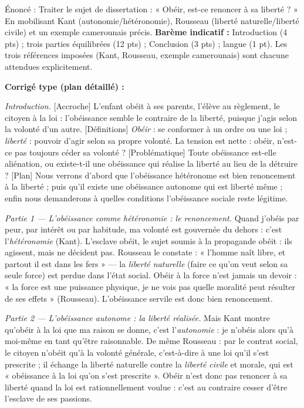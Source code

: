 \documentclass[11pt]{article}
\begin{document}
\begin{exoresolu}
Énoncé : Traiter le sujet de dissertation : « Obéir, est-ce renoncer à sa liberté ? » En mobilisant Kant (autonomie/hétéronomie), Rousseau (liberté naturelle/liberté civile) et un exemple camerounais précis.
\tcblower
\textbf{Barème indicatif :} Introduction (4 pts) ; trois parties équilibrées (12 pts) ; Conclusion (3 pts) ; langue (1 pt). Les trois références imposées (Kant, Rousseau, exemple camerounais) sont chacune attendues explicitement.

\textbf{Corrigé type (plan détaillé) :}

\emph{Introduction.} [Accroche] L'enfant obéit à ses parents, l'élève au règlement, le citoyen à la loi : l'obéissance semble le contraire de la liberté, puisque j'agis selon la volonté d'un autre. [Définitions] \emph{Obéir} : se conformer à un ordre ou une loi ; \emph{liberté} : pouvoir d'agir selon sa propre volonté. La tension est nette : obéir, n'est-ce pas toujours céder sa volonté ? [Problématique] Toute obéissance est-elle aliénation, ou existe-t-il une obéissance qui réalise la liberté au lieu de la détruire ? [Plan] Nous verrons d'abord que l'obéissance hétéronome est bien renoncement à la liberté ; puis qu'il existe une obéissance autonome qui est liberté même ; enfin nous demanderons à quelles conditions l'obéissance sociale reste légitime.

\emph{Partie 1 — L'obéissance comme hétéronomie : le renoncement.} Quand j'obéis par peur, par intérêt ou par habitude, ma volonté est gouvernée du dehors : c'est l'\emph{hétéronomie} (Kant). L'esclave obéit, le sujet soumis à la propagande obéit : ils agissent, mais ne décident pas. Rousseau le constate : « l'homme naît libre, et partout il est dans les fers » — la \emph{liberté naturelle} (faire ce qu'on veut selon sa seule force) est perdue dans l'état social. Obéir à la force n'est jamais un devoir : « la force est une puissance physique, je ne vois pas quelle moralité peut résulter de ses effets » (Rousseau). L'obéissance servile est donc bien renoncement.

\emph{Partie 2 — L'obéissance autonome : la liberté réalisée.} Mais Kant montre qu'obéir à la loi que ma raison se donne, c'est l'\emph{autonomie} : je n'obéis alors qu'à moi-même en tant qu'être raisonnable. De même Rousseau : par le contrat social, le citoyen n'obéit qu'à la volonté générale, c'est-à-dire à une loi qu'il s'est prescrite ; il échange la liberté naturelle contre la \emph{liberté civile} et morale, qui est « obéissance à la loi qu'on s'est prescrite ». Obéir n'est donc pas renoncer à sa liberté quand la loi est rationnellement voulue : c'est au contraire cesser d'être l'esclave de ses passions.


\end{exoresolu}
\end{document}
